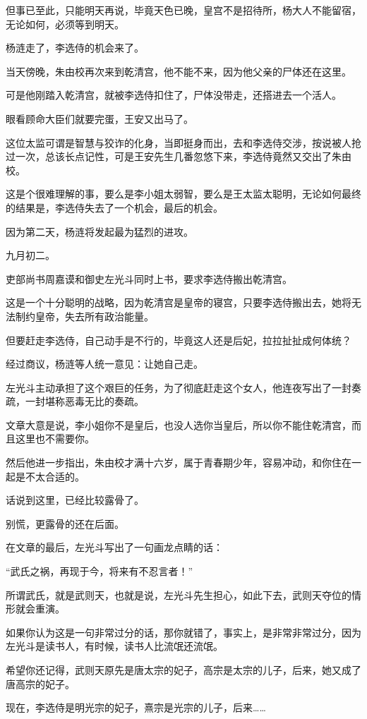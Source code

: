 \begin{multicols}{\theparacolNo}
		但事已至此，只能明天再说，毕竟天色已晚，皇宫不是招待所，杨大人不能留宿，无论如何，必须等到明天。

		杨涟走了，李选侍的机会来了。

		当天傍晚，朱由校再次来到乾清宫，他不能不来，因为他父亲的尸体还在这里。

		可是他刚踏入乾清宫，就被李选侍扣住了，尸体没带走，还搭进去一个活人。

		眼看顾命大臣们就要完蛋，王安又出马了。

		这位太监可谓是智慧与狡诈的化身，当即挺身而出，去和李选侍交涉，按说被人抢过一次，总该长点记性，可是王安先生几番忽悠下来，李选侍竟然又交出了朱由校。

		这是个很难理解的事，要么是李小姐太弱智，要么是王太监太聪明，无论如何最终的结果是，李选侍失去了一个机会，最后的机会。

		因为第二天，杨涟将发起最为猛烈的进攻。

		九月初二。

		吏部尚书周嘉谟和御史左光斗同时上书，要求李选侍搬出乾清宫。

		这是一个十分聪明的战略，因为乾清宫是皇帝的寝宫，只要李选侍搬出去，她将无法制约皇帝，失去所有政治能量。

		但要赶走李选侍，自己动手是不行的，毕竟这人还是后妃，拉拉扯扯成何体统？

		经过商议，杨涟等人统一意见：让她自己走。

		左光斗主动承担了这个艰巨的任务，为了彻底赶走这个女人，他连夜写出了一封奏疏，一封堪称恶毒无比的奏疏。

		文章大意是说，李小姐你不是皇后，也没人选你当皇后，所以你不能住乾清宫，而且这里也不需要你。

		然后他进一步指出，朱由校才满十六岁，属于青春期少年，容易冲动，和你住在一起是不太合适的。

		话说到这里，已经比较露骨了。

		别慌，更露骨的还在后面。

		在文章的最后，左光斗写出了一句画龙点睛的话：

		“武氏之祸，再现于今，将来有不忍言者！”

		所谓武氏，就是武则天，也就是说，左光斗先生担心，如此下去，武则天夺位的情形就会重演。

		如果你认为这是一句非常过分的话，那你就错了，事实上，是非常非常过分，因为左光斗是读书人，有时候，读书人比流氓还流氓。

		希望你还记得，武则天原先是唐太宗的妃子，高宗是太宗的儿子，后来，她又成了唐高宗的妃子。

		现在，李选侍是明光宗的妃子，熹宗是光宗的儿子，后来……


\end{multicols}
